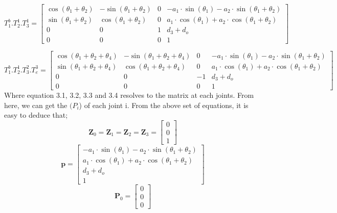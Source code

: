 \documentclass[12pt]{report}
\begin{document}
\begin{equation}
	T_1^b. T_2^1.T_3^1=
	\begin{bmatrix}
		\cos(\theta_1 + \theta_2) & -\sin(\theta_1 + \theta_2) & 0 & -a_1 \cdot \sin(\theta_1) - a_2 \cdot \sin(\theta_1 + \theta_2) \\
		\sin(\theta_1 + \theta_2) & \cos(\theta_1 + \theta_2) & 0 & a_1 \cdot \cos(\theta_1) + a_2 \cdot \cos(\theta_1 + \theta_2) \\
		0 & 0 & 1 & d_3 + d_o \\
		0 & 0 & 0 & 1
	\end{bmatrix}
\end{equation}

\begin{equation}
	T_1^b. T_2^1.T_3^2.T_e^3=
	\begin{bmatrix}
		\cos(\theta_1 + \theta_2 + \theta_4) & -\sin(\theta_1 + \theta_2 + \theta_4) & 0 & -a_1 \cdot \sin(\theta_1) - a_2 \cdot \sin(\theta_1 + \theta_2) \\
		\sin(\theta_1 + \theta_2 + \theta_4) & \cos(\theta_1 + \theta_2 + \theta_4) & 0 & a_1 \cdot \cos(\theta_1) + a_2 \cdot \cos(\theta_1 + \theta_2) \\
		0 & 0 & -1 & d_3 + d_o \\
		0 & 0 & 0 & 1
	\end{bmatrix}
\end{equation}
Where equation 3.1, 3.2, 3.3 and 3.4 resolves to the matrix at each joints. From here, we can get the $(P_i$) of each joint i.
From the above set of equations, it is easy to deduce that;
\begin{equation}
	\mathbf{Z}_0 = \mathbf{Z}_1 = \mathbf{Z}_2 = \mathbf{Z}_3 = 
	\begin{bmatrix}
		0 \\
		0 \\
		1
	\end{bmatrix}
\end{equation}
\begin{equation}
	\textbf{p} =
	\begin{bmatrix}
		-a_1 \cdot \sin(\theta_1) - a_2 \cdot \sin(\theta_1 + \theta_2) \\
		a_1 \cdot \cos(\theta_1) + a_2 \cdot \cos(\theta_1 + \theta_2) \\
		d_3 + d_o \\
		1
	\end{bmatrix}
\end{equation}
\begin{equation}
	\mathbf{P}_0 = 
	\begin{bmatrix}
		0 \\
		0 \\
		0
	\end{bmatrix}
\end{equation}
\end{document}
